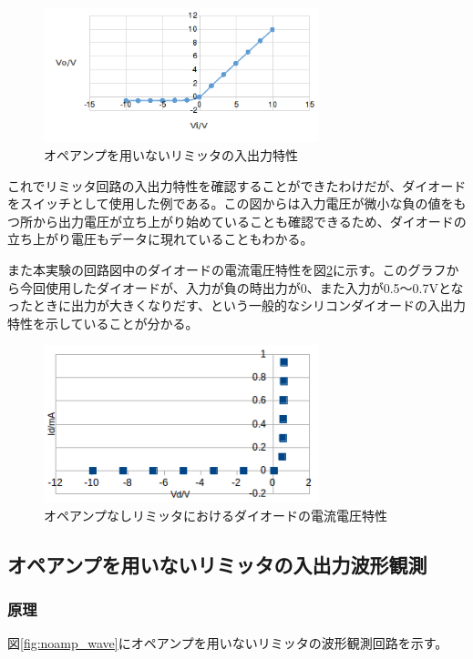 \documentclass[11pt,a4j]{jsarticle}
\begin{document}
    
    \begin{figure}[htbp]
  \centering
  \includegraphics[width=8cm,clip]{1_1_noamp_PS.png}
  \caption{オペアンプを用いないリミッタの入出力特性}
  \label{fig:1_1_noamp_PS}
 \end{figure}%
    
    これでリミッタ回路の入出力特性を確認することができたわけだが、ダイオードをスイッチとして使用した例である。この図からは入力電圧が微小な負の値をもつ所から出力電圧が立ち上がり始めていることも確認できるため、ダイオードの立ち上がり電圧もデータに現れていることもわかる。
    
    また本実験の回路図中のダイオードの電流電圧特性を図\ref{fig:b_noamp}に示す。このグラフから今回使用したダイオードが、入力が負の時出力が0、また入力が0.5～0.7Vとなったときに出力が大きくなりだす、という一般的なシリコンダイオードの入出力特性を示していることが分かる。
    
    \begin{figure}[htbp]
  \centering
  \includegraphics[width=8cm,clip]{b_noamp.png}
  \caption{オペアンプなしリミッタにおけるダイオードの電流電圧特性}
  \label{fig:b_noamp}
 \end{figure}
    
  \subsection{オペアンプを用いないリミッタの入出力波形観測}
   \subsubsection{原理}
    
    図\ref{fig:noamp_wave}にオペアンプを用いないリミッタの波形観測回路を示す。
    
\end{document}
